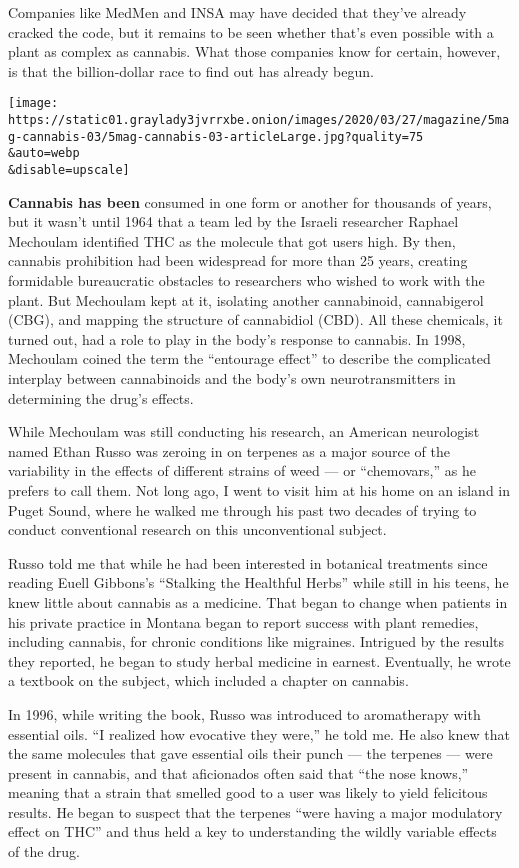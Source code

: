 Companies like MedMen and INSA may have decided that they've already
cracked the code, but it remains to be seen whether that's even possible
with a plant as complex as cannabis. What those companies know for
certain, however, is that the billion-dollar race to find out has
already begun.

\texttt{[image: https://static01.graylady3jvrrxbe.onion/images/2020/03/27/magazine/5mag-cannabis-03/5mag-cannabis-03-articleLarge.jpg?quality=75\\\&auto=webp\\\&disable=upscale]}

\textbf{Cannabis has been} consumed in one form or another for thousands
of years, but it wasn't until 1964 that a team led by the Israeli
researcher Raphael Mechoulam identified THC as the molecule that got
users high. By then, cannabis prohibition had been widespread for more
than 25 years, creating formidable bureaucratic obstacles to researchers
who wished to work with the plant. But Mechoulam kept at it, isolating
another cannabinoid, cannabigerol (CBG), and mapping the structure of
cannabidiol (CBD). All these chemicals, it turned out, had a role to
play in the body's response to cannabis. In 1998, Mechoulam coined the
term the ``entourage effect'' to describe the complicated interplay
between cannabinoids and the body's own neurotransmitters in determining
the drug's effects.

While Mechoulam was still conducting his research, an American
neuro­logist named Ethan Russo was zeroing in on terpenes as a major
source of the variability in the effects of different strains of weed
--- or ``chemovars,'' as he prefers to call them. Not long ago, I went
to visit him at his home on an island in Puget Sound, where he walked me
through his past two decades of trying to conduct conventional research
on this unconventional subject.

Russo told me that while he had been interested in botanical treatments
since reading Euell Gibbons's ``Stalking the Healthful Herbs'' while
still in his teens, he knew little about cannabis as a medicine. That
began to change when patients in his private practice in Montana began
to report success with plant remedies, including cannabis, for chronic
conditions like migraines. Intrigued by the results they reported, he
began to study herbal medicine in earnest. Eventually, he wrote a
textbook on the subject, which included a chapter on cannabis.

In 1996, while writing the book, Russo was introduced to aromatherapy
with essential oils. ``I realized how evocative they were,'' he told me.
He also knew that the same molecules that gave essential oils their
punch --- the terpenes --- were present in cannabis, and that
aficionados often said that ``the nose knows,'' meaning that a strain
that smelled good to a user was likely to yield felicitous results. He
began to suspect that the terpenes ``were having a major modulatory
effect on THC'' and thus held a key to understanding the wildly variable
effects of the drug.

